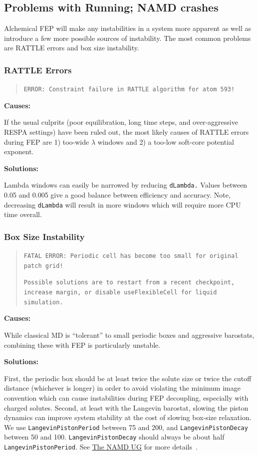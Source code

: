 \documentclass[9pt,tutorial,pubversion]{Styling/livecoms}
\newcommand{\textInput}[1]{\texttt{#1}}
\begin{document}
\subsection{Problems with Running; NAMD crashes}
Alchemical FEP will make any instabilities in a system more apparent as well as introduce a few more possible sources of instability. The most common problems are RATTLE errors and box size instability.

\subsubsection{RATTLE Errors}
\begin{quote}
\texttt{ERROR: Constraint failure in RATTLE algorithm for atom 593!}
\end{quote}

\noindent\textbf{Causes:}

If the usual culprits (poor equilibration, long time steps, and over-aggressive RESPA settings) have been ruled out, the most likely causes of RATTLE errors during FEP are 1) too-wide $\lambda$ windows and 2) a too-low soft-core potential exponent.

\noindent\textbf{Solutions:}

Lambda windows can easily be narrowed by reducing \textInput{dLambda.} Values between 0.05 and 0.005 give a good balance between efficiency and accuracy.
Note, decreasing \textInput{dLambda} will result in more windows which will require more CPU time overall.

\subsubsection{Box Size Instability}
\begin{quote}
\texttt{FATAL ERROR: Periodic cell has become too small for original patch grid!}

\texttt{Possible solutions are to restart from a recent checkpoint,
increase margin, or disable useFlexibleCell for liquid simulation.}
\end{quote}

\noindent\textbf{Causes:}

While classical MD is ``tolerant'' to small periodic boxes and aggressive barostats, combining these with FEP is particularly unstable.

\noindent\textbf{Solutions:}

First, the periodic box should be at least twice the solute size or twice the cutoff distance (whichever is longer) in order to avoid violating the minimum image convention which can cause instabilities during FEP decoupling, especially with charged solutes. Second, at least with the Langevin barostat, slowing the piston dynamics can improve system stability at the cost of slowing box-size relaxation. We use \textInput{LangevinPistonPeriod} between 75 and 200, and \textInput{LangevinPistonDecay} between 50 and 100. \textInput{LangevinPistonDecay} should always be about half \textInput{LangevinPistonPeriod}. See \href{https://www.ks.uiuc.edu/Research/namd/2.14/ug/node39.html}{The NAMD UG} for more details~\cite{Bernardi2020}.
\end{document}
